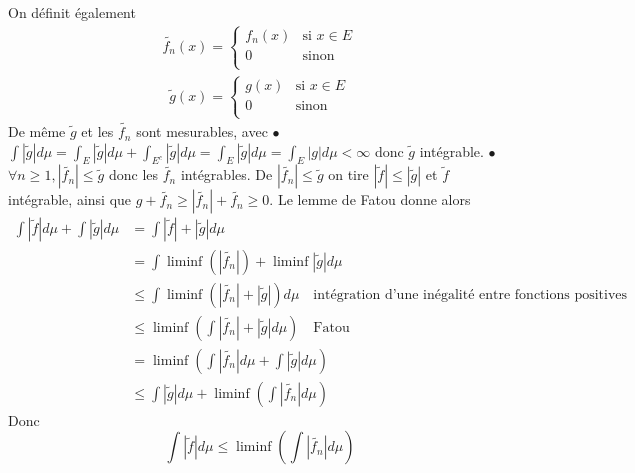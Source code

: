 \documentclass{report}
\begin{document}
On définit également  $$\begin{aligned}
  \widetilde{f_n}(x)=
  \begin{cases}
    f_n(x) & \text{si }  x\in E \\
    0 & \text{sinon }  \\
  \end{cases}
\end{aligned}$$ $$\begin{aligned}
  \widetilde{g}(x)=
  \begin{cases}
    g(x) & \text{si }  x\in E \\
    0 & \text{sinon }  \\
  \end{cases}
\end{aligned}$$\newline
De même $\widetilde{g}$ et les $\widetilde{f_n}$ sont mesurables, avec \newline
$\bullet$ $\int |\widetilde{g}| d\mu  = \int_E  |\widetilde{g}| d\mu + \int_{E^c}  |\widetilde{g}| d\mu =\int_E  |\widetilde{g}| d\mu = \int_E  |g| d\mu <\infty $ donc $\widetilde{g}$ intégrable. \newline
$\bullet$ $\forall n\geq 1, |\widetilde{f_n}|\leq \widetilde{g}$ donc les $\widetilde{f_n}$ intégrables. \newline
De $ |\widetilde{f_n}|\leq \widetilde{g}$ on tire  $|\widetilde{f}|\leq |\widetilde{g}|$ et $\widetilde{f}$ intégrable, ainsi que $g+\widetilde{f_n}\geq |\widetilde{f_n}| +\widetilde{f_n} \geq 0$. Le lemme de Fatou donne alors $$\begin{aligned} \int |\widetilde{f}| d\mu + \int |\widetilde{g}| d\mu  
&=  \int |\widetilde{f}| +  |\widetilde{g}| d\mu \\
&= \int \liminf \left(|\widetilde{f_n}|\right) +  \liminf|\widetilde{g}| d\mu\\
&\leq \int \liminf \left( |\widetilde{f_n}| +  |\widetilde{g}| \right)d\mu \quad \text{intégration d'une inégalité entre fonctions positives} \\
&\leq \liminf\left(  \int |\widetilde{f_n}| +  |\widetilde{g}| d\mu \right) \quad \text{Fatou }\\
&= \liminf\left(  \int |\widetilde{f_n}| d\mu  +  \int |\widetilde{g}| d\mu \right) \\
&\leq \int |\widetilde{g}| d\mu + \liminf \left( \int  |\widetilde{f_n}| d\mu\right)
\end{aligned}$$\newline
Donc $$ \int |\widetilde{f}| d\mu \leq \liminf \left( \int  |\widetilde{f_n}| d\mu\right)$$\newline
\end{document}
